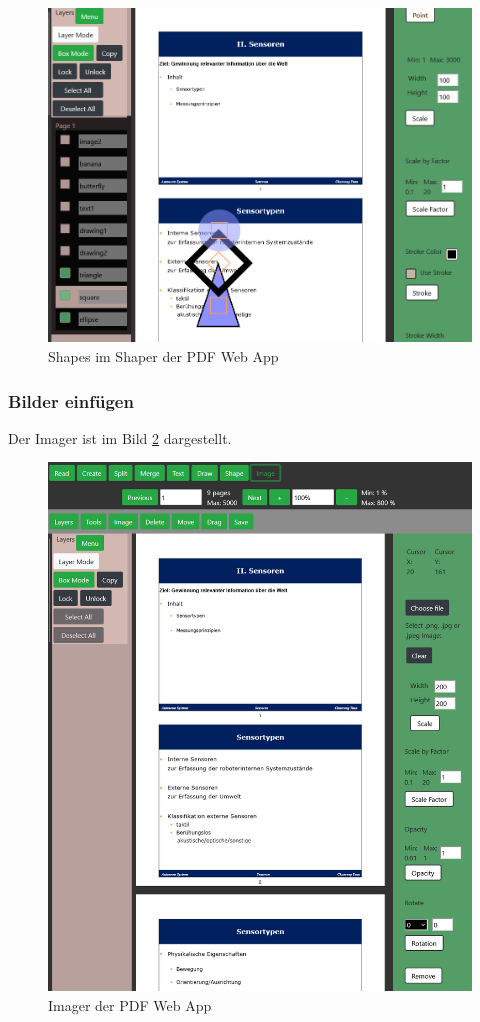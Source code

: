 \begin{figure}[!htbp]
	\centering
	\includegraphics[width=1\textwidth]{"images/shaping.png"}
	\caption{Shapes im Shaper der PDF Web App}
	\label{fig:shaping}
\end{figure}


\subsubsection{Bilder einfügen}
Der Imager ist im Bild \ref{fig:images} dargestellt. 

\begin{figure}[!htbp]
	\centering
	\includegraphics[width=1\textwidth]{"images/images.png"}
	\caption{Imager der PDF Web App}
	\label{fig:images}
\end{figure}

